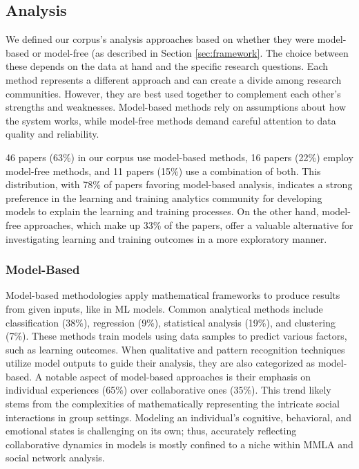 \documentclass[manuscript,screen,review]{acmart}
\begin{document}
\subsection{Analysis}\label{subsec:findings_analysis}

We defined our corpus's analysis approaches based on whether they were model-based or model-free (as described in Section \ref{sec:framework}. The choice between these depends on the data at hand and the specific research questions. Each method represents a different approach and can create a divide among research communities. However, they are best used together to complement each other's strengths and weaknesses. Model-based methods rely on assumptions about how the system works, while model-free methods demand careful attention to data quality and reliability.

46 papers (63\%) in our corpus use model-based methods, 16 papers (22\%) employ model-free methods, and 11 papers (15\%) use a combination of both. This distribution, with 78\% of papers favoring model-based analysis, indicates a strong preference in the learning and training analytics community for developing models to explain the learning and training processes. On the other hand, model-free approaches, which make up 33\% of the papers, offer a valuable alternative for investigating learning and training outcomes in a more exploratory manner.

\subsubsection{Model-Based}

Model-based methodologies apply mathematical frameworks to produce results from given inputs, like in ML models. Common analytical methods include classification (38\%), regression (9\%), statistical analysis (19\%), and clustering (7\%). These methods train models using data samples to predict various factors, such as learning outcomes. When qualitative and pattern recognition techniques utilize model outputs to guide their analysis, they are also categorized as model-based. A notable aspect of model-based approaches is their emphasis on individual experiences (65\%) over collaborative ones (35\%). This trend likely stems from the complexities of mathematically representing the intricate social interactions in group settings. Modeling an individual's cognitive, behavioral, and emotional states is challenging on its own; thus, accurately reflecting collaborative dynamics in models is mostly confined to a niche within MMLA and social network analysis.
\end{document}
